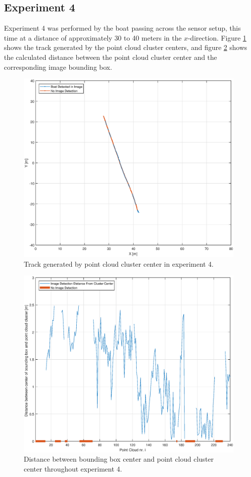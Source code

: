 \subsection{Experiment 4}
Experiment 4 was performed by the boat passing across the sensor setup, this time at a distance of approximately 30 to 40 meters in the $x$-direction. Figure \ref{fig:ex4_track} shows the track generated by the point cloud cluster centers, and figure \ref{fig:ex4_pc_dist} shows the calculated distance between the point cloud cluster center and the corresponding image bounding box.
\begin{figure}[H]
	\centering
	\includegraphics[width=.8\linewidth]{fig/exp_4_track.eps}
	\caption{Track generated by point cloud cluster center in experiment 4.}
	\label{fig:ex4_track}
\end{figure}
\begin{figure}[H]
	\centering
	\includegraphics[width=.7\linewidth]{fig/exp_4_dist_pr_pc.eps}
	\caption{Distance between bounding box center and point cloud cluster center throughout experiment 4.}
	\label{fig:ex4_pc_dist}
\end{figure}
